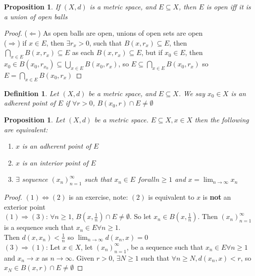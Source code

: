 \documentclass{article}
\newtheorem{definition}[theorem]{Definition}
\newtheorem{proposition}[theorem]{Proposition}
\begin{document}
\begin{proposition}
    If $(X,d)$ is a metric space, and $E \subseteq X$, then $E$ is open iff it is a union
    of open balls
\end{proposition}
\begin{proof}
    ($\Leftarrow$) As open balls are open, unions of open sets are open \\
    ($\Rightarrow$) if $x \in E$, then $\exists r_x>0$, such that $B(x,r_x)\subseteq E$,
    then $\bigcap\limits_{x\in E} B(x,r_x) \subseteq E$ as each $B(x,r_x) \subseteq E$,
    but if $x_0 \in E$, then
    $x_0 \in B(x_0, r_{x_0}) \subseteq \bigcup\limits_{x\in E} B(x_0, r_x)$, so
    $E \subseteq \bigcap\limits_{x\in E} B(x_0, r_x)$ so
    $E = \bigcap\limits_{x\in E} B(x_0, r_x)$
\end{proof}

\begin{definition}
    Let $(X, d)$ be a metric space, and $E \subseteq X$. We say $x_0 \in X$ is an
    adherent point of $E$ if $\forall r > 0$, $B(x_0, r) \cap E \not= \emptyset$
\end{definition}

\begin{proposition}
    Let $(X, d)$ be a metric space. $E \subseteq X, x \in X$ then the following are
    equivalent:
    \begin{enumerate}
        \item $x$ is an adherent point of $E$
        \item $x$ is an interior point of $E$
        \item $\exists$ sequence $(x_n)_{n=1}^{\infty}$ such that $x_n \in E$
            $forall n \geq 1$ and $x = \lim_{n\rightarrow \infty} x_n$
    \end{enumerate}
\end{proposition}
\begin{proof}
    $(1) \Leftrightarrow (2)$ is an exercise, note: $(2)$ is equivalent to $x$ is
    \textbf{not} an exterior point \\
    $(1) \Rightarrow (3)$: $\forall n \geq 1$, $B(x, \frac{1}{n}) \cap E \not= \emptyset$.
    So let $x_n \in B(x, \frac{1}{n})$. Then $(x_n)_{n=1}^{\infty}$ is a sequence such
    that $x_n \in E \forall n \geq 1$. \\
    Then $d(x, x_n) < \frac{1}{n}$ so
    $\lim_{n\rightarrow \infty} d(x_n, x) = 0$ \\
    $(3) \Rightarrow (1)$: Let $x \in X$, let $(x_n)_{n=1}^{\infty}$, be a sequence such
    that $x_n \in E \forall n \geq 1$ and $x_n \rightarrow x$ as $n \rightarrow \infty$.
    Given $r > 0$, $\exists N \geq 1$ such that $\forall n \geq N, d(x_n, x) < r$, so
    $x_N \in B(x,r) \cap E \not= \emptyset$
\end{proof}
\end{document}

